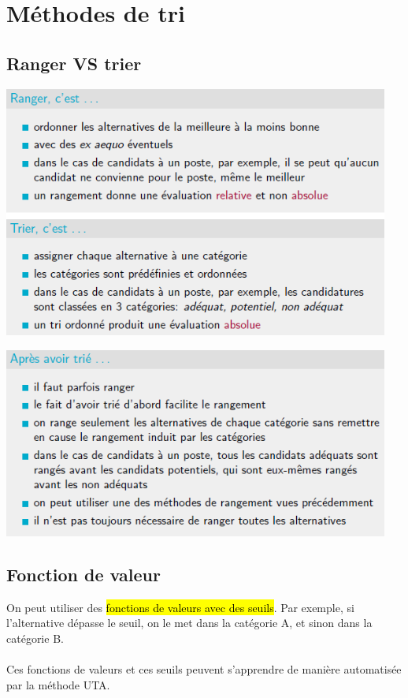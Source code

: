 \documentclass[a4paper, 12pt]{article}
\newcommand{\alinea}{
\hspace*{0.5cm}}
\begin{document}
\section{Méthodes de tri}
	\subsection{Ranger VS trier}
		\begin{center}
			\includegraphics[width=5in]{Images/ranger_vs_trier}
		\end{center}
		\begin{center}
			\includegraphics[width=5in]{Images/trier}
		\end{center}
	\subsection{Fonction de valeur}
		\alinea On peut utiliser des \hl{fonctions de valeurs avec des seuils}. Par exemple, si l'alternative dépasse le seuil,
			on le met dans la catégorie A, et sinon dans la catégorie B.\\
		~\\
		\alinea Ces fonctions de valeurs et ces seuils peuvent s'apprendre de manière automatisée par la méthode UTA.
\end{document}
